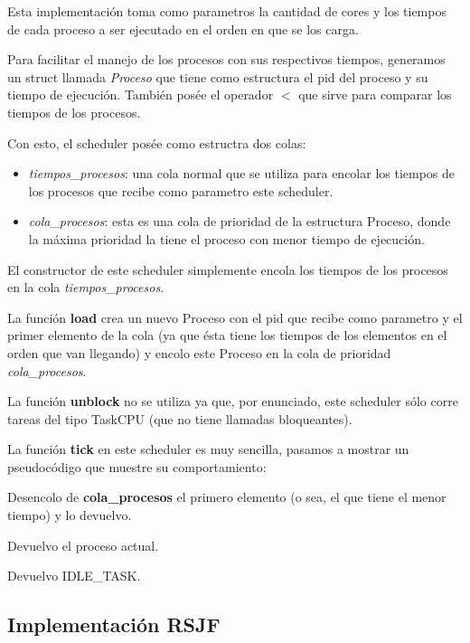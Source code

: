 Esta implementación toma como parametros la cantidad de cores y los tiempos de cada proceso a ser ejecutado en el orden en que se los carga.

Para facilitar el manejo de los procesos con sus respectivos tiempos, generamos un struct llamada \emph{Proceso} que tiene como estructura el pid del proceso y su tiempo de ejecución. También posée el operador $<$ que sirve para comparar los tiempos de los procesos.

Con esto, el scheduler posée como estructra dos colas:

\begin{itemize}

\item \emph{tiempos\_procesos}: una cola normal que se utiliza para encolar los tiempos de los procesos que recibe como parametro este scheduler.

\item \emph{cola\_procesos}: esta es una cola de prioridad de la estructura Proceso, donde la máxima prioridad la tiene el proceso con menor tiempo de ejecución.

\end{itemize}

El constructor de este scheduler simplemente encola los tiempos de los procesos en la cola \emph{tiempos\_procesos}.

La función \textbf{load} crea un nuevo Proceso con el pid que recibe como parametro y el primer elemento de la cola (ya que ésta tiene los tiempos de los elementos en el orden que van llegando) y encolo este Proceso en la cola de prioridad \emph{cola\_procesos}.

La función \textbf{unblock} no se utiliza ya que, por enunciado, este scheduler sólo corre tareas del tipo TaskCPU (que no tiene llamadas bloqueantes).

La función \textbf{tick} en este scheduler es muy sencilla, pasamos a mostrar un pseudocódigo que muestre su comportamiento:

\begin{algorithmic}

		\State Desencolo de \textbf{cola\_procesos} el primero elemento (o sea, el que tiene el menor tiempo) y lo devuelvo.
	
		\State Devuelvo el proceso actual.

	\Else
		\State Devuelvo IDLE\_TASK.
	\EndIf
\EndFunction	
\end{algorithmic}


\subsection{Implementación \textbf{RSJF}}

